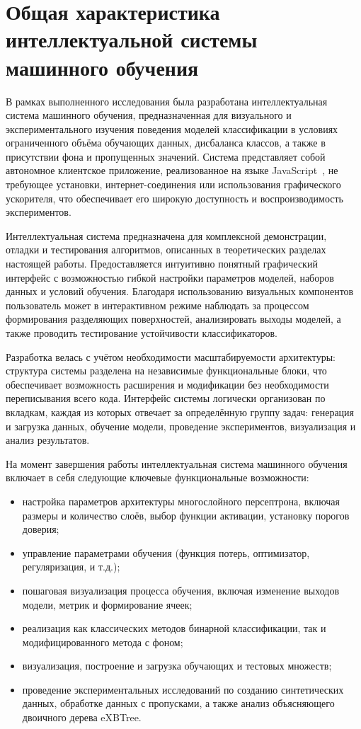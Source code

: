\section{Общая характеристика интеллектуальной системы машинного обучения}

В рамках выполненного исследования была разработана интеллектуальная система машинного обучения, предназначенная для визуального и экспериментального изучения поведения моделей классификации в условиях ограниченного объёма обучающих данных, дисбаланса классов, а также в присутствии фона и пропущенных значений. Система представляет собой автономное клиентское приложение, реализованное на языке JavaScript~\cite{flanagan2013javascript}, не требующее установки, интернет-соединения или использования графического ускорителя, что обеспечивает его широкую доступность и воспроизводимость экспериментов.

Интеллектуальная система предназначена для комплексной демонстрации, отладки и тестирования алгоритмов, описанных в теоретических разделах настоящей работы. Предоставляется интуитивно понятный графический интерфейс с возможностью гибкой настройки параметров моделей, наборов данных и условий обучения. Благодаря использованию визуальных компонентов пользователь может в интерактивном режиме наблюдать за процессом формирования разделяющих поверхностей, анализировать выходы моделей, а также проводить тестирование устойчивости классификаторов.

Разработка велась с учётом необходимости масштабируемости архитектуры: структура системы разделена на независимые функциональные блоки, что обеспечивает возможность расширения и модификации без необходимости переписывания всего кода. Интерфейс системы логически организован по вкладкам, каждая из которых отвечает за определённую группу задач: генерация и загрузка данных, обучение модели, проведение экспериментов, визуализация и анализ результатов.

На момент завершения работы интеллектуальная система машинного обучения включает в себя следующие ключевые функциональные возможности:
\begin{itemize}
    \item настройка параметров архитектуры многослойного персептрона, включая размеры и количество слоёв, выбор функции активации, установку порогов доверия;
    \item управление параметрами обучения (функция потерь, оптимизатор, регуляризация, и т.д.);
    \item пошаговая визуализация процесса обучения, включая изменение выходов модели, метрик и формирование ячеек;
    \item реализация как классических методов бинарной классификации, так и модифицированного метода с фоном;
    \item визуализация, построение и загрузка обучающих и тестовых множеств;
    \item проведение экспериментальных исследований по созданию синтетических данных, обработке данных с пропусками, а также анализ объясняющего двоичного дерева eXBTree.
\end{itemize}

